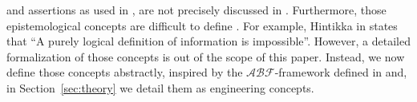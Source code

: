 \documentclass[conference]{IEEEtran}
\newcommand{\assertionRegion}{\mathcal{A}}
\newcommand{\beliefRegion}{\mathcal{B}}
\newcommand{\factRegion}{\mathcal{F}}
\newcommand{\abftheory}{\assertionRegion\beliefRegion\factRegion}
\begin{document}
and assertions as used in \autocite{Santaca2016abf}, are not precisely discussed
in \autocite{Santaca2016abf}.  Furthermore, those epistemological concepts are
difficult to define
\autocite{Gettier2012knowledge}.
For example, Hintikka in
\autocite{Hintikka1993Information} states that ``A purely logical definition of
information is impossible''. However, a detailed formalization of those concepts is out
of the scope of this paper. 
Instead, we now define those concepts abstractly, inspired by the
$\abftheory$-framework  defined in \autocite{Santaca2016abf} and, in
Section~\ref{sec:theory} we detail them as engineering concepts.
\end{document}
